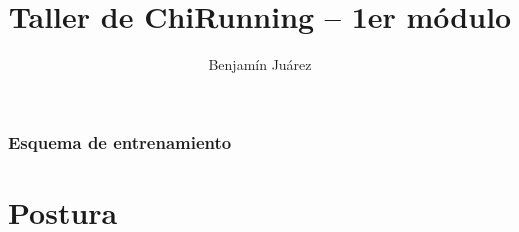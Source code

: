 \documentclass{beamer}
\title[Taller CR]{Taller de ChiRunning – 1er módulo} %
\author{Benjamín Juárez} %
\institute[Instructor certificado] %
{%
Instructor certificado de ChiRunning \\%
\medskip
\textit{cr.southamerica@gmail.com} %
}
\date{\the\year %
} %
\begin{document}
\begin{frame}
\titlepage %
\end{frame}

\begin{frame}
\frametitle{Esquema de entrenamiento} %
\tableofcontents %
\end{frame}


\section{Postura} %

\end{document}

